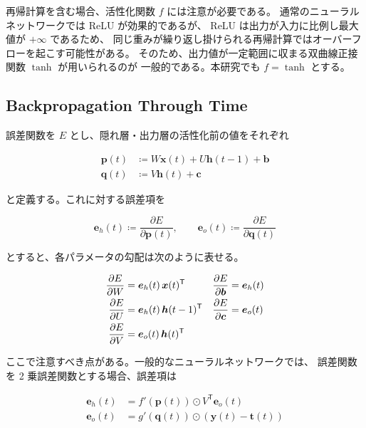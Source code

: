 \documentclass[a4paper,11pt,openany]{ltjsreport}
\begin{document}
再帰計算を含む場合、活性化関数 $f$ には注意が必要である。
通常のニューラルネットワークでは ReLU が効果的であるが、
ReLU は出力が入力に比例し最大値が $+\infty$ であるため、
同じ重みが繰り返し掛けられる再帰計算ではオーバーフローを起こす可能性がある。
そのため、出力値が一定範囲に収まる双曲線正接関数 $\tanh$ が用いられるのが
一般的である\cite{sugomori2019}。本研究でも $f = \tanh$ とする。

\subsection{Backpropagation Through Time}

誤差関数を $E$ とし、隠れ層・出力層の活性化前の値をそれぞれ

\begin{align}
  \bm{p}(t) &\coloneqq W\bm{x}(t) + U\bm{h}(t-1) + \bm{b} \label{eq:p}\\
  \bm{q}(t) &\coloneqq V\bm{h}(t) + \bm{c}                \label{eq:q}
\end{align}

と定義する。これに対する誤差項を

\begin{equation}
  \bm{e}_h(t) \coloneqq \frac{\partial E}{\partial \bm{p}(t)}, \qquad
  \bm{e}_o(t) \coloneqq \frac{\partial E}{\partial \bm{q}(t)}
  \label{eq:err}
\end{equation}

とすると、各パラメータの勾配は次のように表せる。

\begin{align}
  \frac{\partial E}{\partial W} &= \bm{e}_h(t)\,\bm{x}(t)^{\mathsf{T}} &
  \frac{\partial E}{\partial \bm{b}} &= \bm{e}_h(t) \notag\\
  \frac{\partial E}{\partial U} &= \bm{e}_h(t)\,\bm{h}(t-1)^{\mathsf{T}} &
  \frac{\partial E}{\partial \bm{c}} &= \bm{e}_o(t) \label{eq:grads}\\
  \frac{\partial E}{\partial V} &= \bm{e}_o(t)\,\bm{h}(t)^{\mathsf{T}} & & \notag
\end{align}

ここで注意すべき点がある。一般的なニューラルネットワークでは、
誤差関数を 2 乗誤差関数とする場合、誤差項は

\begin{align}
  \bm{e}_h(t) &= f'(\bm{p}(t)) \odot V^{\mathsf{T}}\bm{e}_o(t) \label{eq:eh}\\
  \bm{e}_o(t) &= g'(\bm{q}(t)) \odot \left(\bm{y}(t) - \bm{t}(t)\right) \label{eq:eo}
\end{align}
\end{document}
